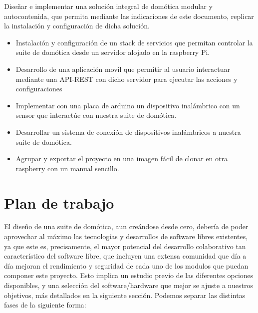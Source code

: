 Diseñar e implementar una solución integral de domótica modular y autocontenida, que permita mediante las indicaciones de este documento, replicar la instalación y configuración de dicha solución.
\begin{itemize}
  \item Instalación y configuración de un stack de servicios que permitan controlar la suite de domótica desde un servidor alojado en la raspberry Pi.

  \item Desarrollo de una aplicación movil que permitir al usuario interactuar mediante una API-REST con dicho servidor para ejecutar las acciones y configuraciones

  \item Implementar con una placa de arduino un dispositivo inalámbrico con un sensor que interactúe con nuestra suite de domótica.

  \item Desarrollar un sistema de conexión de dispositivos inalámbricos a nuestra suite de domótica.

  \item Agrupar y exportar el proyecto en una imagen fácil de clonar en otra raspberry con un manual sencillo.
\end{itemize}

\section{Plan de trabajo}
\label{ch:Capitulo1.3}

El diseño de una suite de domótica, aun creándose desde cero, debería de poder aprovechar al máximo las tecnologías y desarrollos de software libres existentes, ya que este es, precisamente, el mayor potencial del desarrollo colaborativo tan característico del software libre, que incluyen una extensa comunidad que día a día mejoran el rendimiento y seguridad de cada uno de los modulos que puedan componer este proyecto. Esto implica un estudio previo de las diferentes opciones disponibles, y una selección del software/hardware que mejor se ajuste a nuestros objetivos, más detallados en la siguiente sección. Podemos separar las distintas fases de la siguiente forma:

